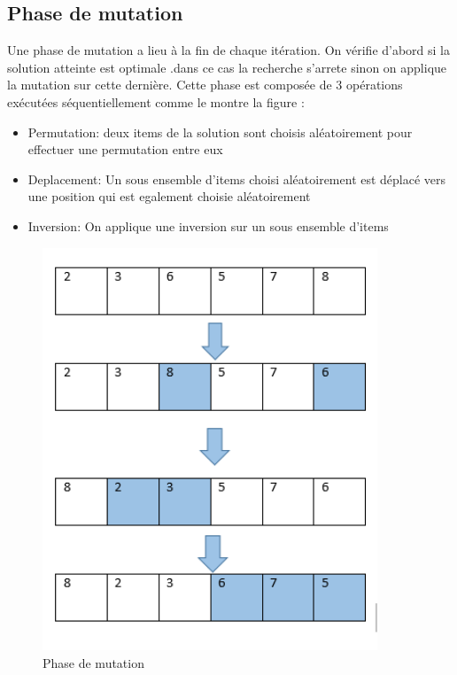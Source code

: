 \documentclass[12pt]{article}
\begin{document}
\subsection{Phase de mutation}
Une phase de mutation a lieu à la fin de chaque itération. On vérifie d'abord si la solution atteinte est optimale .dans ce cas la recherche s'arrete sinon on applique la mutation sur cette dernière.
Cette phase est composée de 3 opérations exécutées séquentiellement comme le montre la figure \textbf{\emph{}}: 
\begin{itemize}
    \item Permutation: deux items de la solution sont choisis aléatoirement pour effectuer une permutation entre eux
    \item Deplacement: Un sous ensemble d'items choisi aléatoirement est déplacé vers une position qui est egalement choisie aléatoirement
    \item Inversion: On applique une inversion sur un sous ensemble d'items
\end{itemize}
\begin{figure}[h!]
   \centering
    \includegraphics[width=10cm]{../figures/Mutation.PNG}
    \caption{Phase de mutation}
    \label{fig:mutation}
\end{figure}
\end{document}
